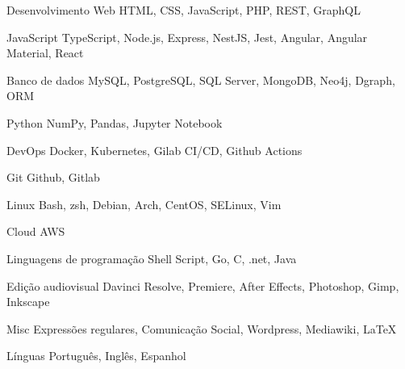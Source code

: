 

\begin{cvskills}

  \cvskill
    {Desenvolvimento Web} %
    {HTML, CSS, JavaScript, PHP, REST, GraphQL} %

  \cvskill
    {JavaScript} %
    {TypeScript, Node.js, Express, NestJS, Jest, Angular, Angular Material, React} %

  \cvskill
    {Banco de dados} %
    {MySQL, PostgreSQL, SQL Server, MongoDB, Neo4j, Dgraph, ORM} %

  \cvskill
    {Python} %
    {NumPy, Pandas, Jupyter Notebook} %

  \cvskill
    {DevOps} %
    {Docker, Kubernetes, Gilab CI/CD, Github Actions} %

  \cvskill
    {Git} %
    {Github, Gitlab} %

  \cvskill
    {Linux} %
    {Bash, zsh, Debian, Arch, CentOS, SELinux, Vim} %

  \cvskill
    {Cloud} %
    {AWS} %

  \cvskill
    {Linguagens de programação} %
    {Shell Script, Go, C, .net, Java} %

  \cvskill
    {Edição audiovisual} %
    {Davinci Resolve, Premiere, After Effects, Photoshop, Gimp, Inkscape} %

  \cvskill
    {Misc} %
    {Expressões regulares, Comunicação Social, Wordpress, Mediawiki, \LaTeX} %

  \cvskill
    {Línguas} %
    {Português, Inglês, Espanhol} %

\end{cvskills}
